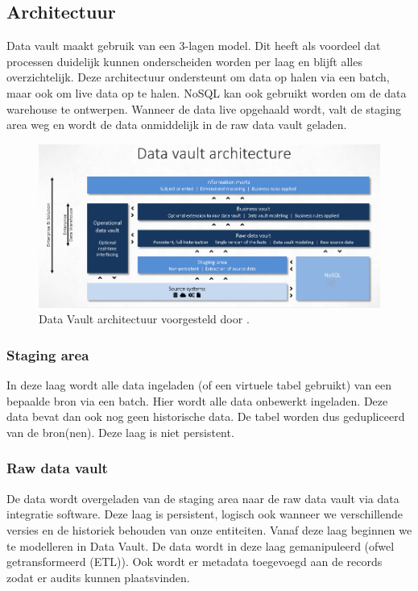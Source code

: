 \subsection{Architectuur}
Data vault maakt gebruik van een 3-lagen model. Dit heeft als voordeel dat processen duidelijk kunnen onderscheiden worden per laag en blijft alles overzichtelijk. Deze architectuur ondersteunt om data op halen via een batch, maar ook om live data op te halen. NoSQL kan ook gebruikt worden om de data warehouse te ontwerpen. Wanneer de data live opgehaald wordt, valt de staging area weg en wordt de data onmiddelijk in de raw data vault geladen.  ~\autocite{Linstedt2016}


\begin{figure}[h]
	\includegraphics[scale=0.63]{../images/DVArchitectuur.png}
	\caption{Data Vault architectuur voorgesteld door \textcite{Stroobants2018}.}
	\label{fig:dvarch}
\end{figure}

\subsubsection{Staging area}
In deze laag wordt alle data ingeladen (of een virtuele tabel gebruikt) van een bepaalde bron via een batch. Hier wordt alle data onbewerkt ingeladen. Deze data bevat dan ook nog geen historische data. De tabel worden dus gedupliceerd van de bron(nen). Deze laag is niet persistent.

\subsubsection{Raw data vault}
De data wordt overgeladen van de staging area naar de raw data vault via data integratie software. Deze laag is persistent, logisch ook wanneer we verschillende versies en de historiek behouden van onze entiteiten. Vanaf deze laag beginnen we te modelleren in Data Vault. De data wordt in deze laag gemanipuleerd (ofwel getransformeerd (ETL)). Ook wordt er metadata toegevoegd aan de records zodat er audits kunnen plaatsvinden. 

